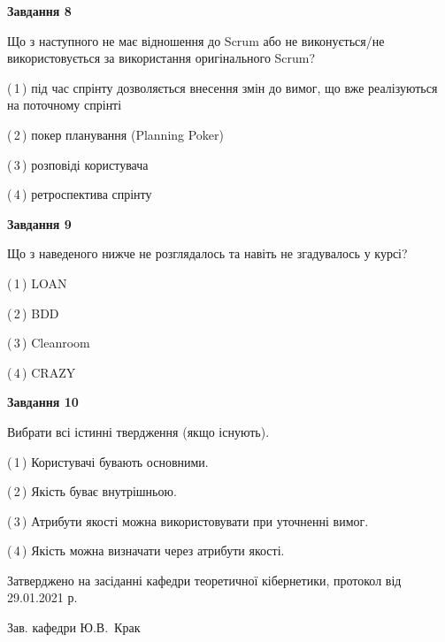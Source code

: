 \documentclass[10pt, ukrainian]{article}
\begin{document}
{\begin {large}
{\begin {center}\textbf{Завдання 8}\end {center}}\par
Що з наступного не має відношення до Scrum або не виконується/не використовується за використання оригінального Scrum?\par
\vspace{2mm}



(\,1\,) під час спрінту дозволяється внесення змін до вимог, що вже реалізуються на поточному спрінті%



(\,2\,) покер планування (Planning Poker)%



(\,3\,) розповіді користувача%



(\,4\,) ретроспектива спрінту%


{\begin {center}\textbf{Завдання 9}\end {center}}\par
Що з наведеного нижче не розглядалось та навіть не згадувалось у курсі?\par
\vspace{2mm}



(\,1\,) LOAN%



(\,2\,) BDD%



(\,3\,) Cleanroom%



(\,4\,) CRAZY%


{\begin {center}\textbf{Завдання 10}\end {center}}\par
Вибрати всі істинні твердження (якщо існують).\par
\vspace{2mm}



(\,1\,) Користувачі бувають основними.%



(\,2\,) Якість буває внутрішньою.%



(\,3\,) Атрибути якості можна використовувати при уточненні вимог.%



(\,4\,) Якість можна визначати через атрибути якості.%



\end {large}}
{\vspace{5mm}\smallskip \begin {small} Затверджено на засіданні кафедри теоретичної кібернетики, протокол  від   29.01.2021 р.\par\smallskip\smallskip
{\parbox {6.5 cm}{Зав. кафедри \dotfill Ю.В.~Крак}} \end{small}}
\newpage
\end{document}
